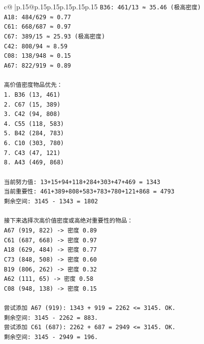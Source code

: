 \documentclass{article}
\begin{document}
{\begin{supertabular}{c@{$\;$}|p{.15\linewidth}@{}p{.15\linewidth}p{.15\linewidth}p{.15\linewidth}p{.15\linewidth}p{.15\linewidth}}
{{{\texttt{B36: 461/13 ≈ 35.46 (极高密度)} \\
\texttt{A18: 484/629 ≈ 0.77} \\
\texttt{C61: 668/687 ≈ 0.97} \\
\texttt{C67: 389/15 ≈ 25.93 (极高密度)} \\
\texttt{C42: 808/94 ≈ 8.59} \\
\texttt{C08: 138/948 ≈ 0.15} \\
\texttt{A67: 822/919 ≈ 0.89} \\
\\ 
\texttt{高价值密度物品优先：} \\
\texttt{1. B36 (13, 461)} \\
\texttt{2. C67 (15, 389)} \\
\texttt{3. C42 (94, 808)} \\
\texttt{4. C55 (118, 583)} \\
\texttt{5. B42 (284, 783)} \\
\texttt{6. C10 (303, 780)} \\
\texttt{7. C43 (47, 121)} \\
\texttt{8. A43 (469, 868)} \\
\\ 
\texttt{当前努力值: 13+15+94+118+284+303+47+469 = 1343} \\
\texttt{当前重要性: 461+389+808+583+783+780+121+868 = 4793} \\
\texttt{剩余空间: 3145 {-} 1343 = 1802} \\
\\ 
\texttt{接下来选择次高价值密度或高绝对重要性的物品：} \\
\texttt{A67 (919, 822) {-}> 密度 0.89} \\
\texttt{C61 (687, 668) {-}> 密度 0.97} \\
\texttt{A18 (629, 484) {-}> 密度 0.77} \\
\texttt{C73 (848, 508) {-}> 密度 0.60} \\
\texttt{B19 (806, 262) {-}> 密度 0.32} \\
\texttt{A62 (111, 65) {-}> 密度 0.58} \\
\texttt{C08 (948, 138) {-}> 密度 0.15} \\
\\ 
\texttt{尝试添加 A67 (919): 1343 + 919 = 2262 <= 3145. OK.} \\
\texttt{剩余空间: 3145 {-} 2262 = 883.} \\
\texttt{尝试添加 C61 (687): 2262 + 687 = 2949 <= 3145. OK.} \\
\texttt{剩余空间: 3145 {-} 2949 = 196.} \\
}}}
\end{supertabular}}
\end{document}
